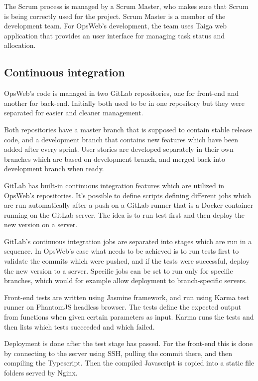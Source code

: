 The Scrum process is managed by a Scrum Master, who makes sure that Scrum is being correctly used for the project. Scrum Master is a member of the development team. For OpsWeb's development, the team uses Taiga web application \cite{taiga} that provides an user interface for managing task status and allocation.

\subsection{Continuous integration}
OpsWeb's code is managed in two GitLab repositories, one for front-end and another for back-end. Initially both used to be in one repository but they were separated for easier and cleaner management.

Both repositories have a master branch that is supposed to contain stable release code, and a development branch that contains new features which have been added after every sprint. User stories are developed separately in their own branches which are based on development branch, and merged back into development branch when ready.

GitLab has built-in continuous integration features which are utilized in OpsWeb's repositories. It's possible to define scripts defining different jobs which are run automatically after a push on a GitLab runner that is a Docker container running on the GitLab server. The idea is to run test first and then deploy the new version on a server.

GitLab's continuous integration jobs are separated into stages which are run in a sequence. In OpsWeb's case what needs to be achieved is to run tests first to validate the commits which were pushed, and if the tests were successful, deploy the new version to a server. Specific jobs can be set to run only for specific branches, which would for example allow deployment to branch-specific servers.

Front-end tests are written using Jasmine framework, and run using Karma test runner on PhantomJS headless browser. The tests define the expected output from functions when given certain parameters as input. Karma runs the tests and then lists which tests succeeded and which failed.

Deployment is done after the test stage has passed. For the front-end this is done by connecting to the server using SSH, pulling the commit there, and then compiling the Typescript. Then the compiled Javascript is copied into a static file folders served by Nginx.

